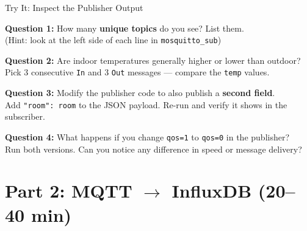 \documentclass[aspectratio=169,11pt]{beamer}
\begin{document}
\begin{frame}[fragile]{ Try It: Inspect the Publisher Output}

    \vspace{0.2cm}
    \textbf{Question 1:} How many \textbf{unique topics} do you see? List them.\\
    {\small (Hint: look at the left side of each line in \texttt{mosquitto\_sub})}

    \vspace{0.2cm}
    \textbf{Question 2:} Are indoor temperatures generally higher or lower than outdoor?\\
    {\small Pick 3 consecutive \texttt{In} and 3 \texttt{Out} messages --- compare the \texttt{temp} values.}

    \vspace{0.2cm}
    \textbf{Question 3:} Modify the publisher code to also publish a \textbf{second field}.\\
    Add \texttt{"room": room} to the JSON payload. Re-run and verify it shows in the subscriber.

    \vspace{0.2cm}
    \textbf{Question 4:} What happens if you change \texttt{qos=1} to \texttt{qos=0} in the publisher?\\
    {\small Run both versions. Can you notice any difference in speed or message delivery?}

    \vspace{0.1cm}
\end{frame}

\section{Part 2: MQTT $\rightarrow$ InfluxDB (20--40 min)}
\end{document}
